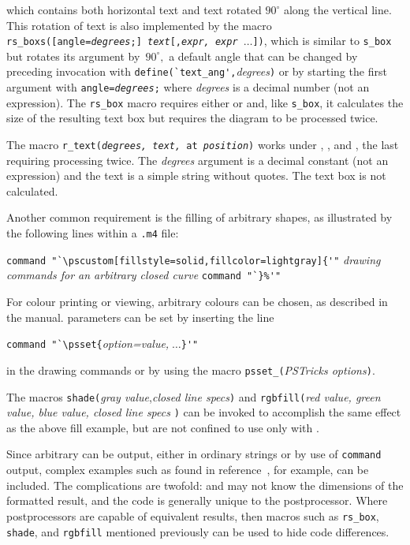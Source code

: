 {\small }

\noindent%
which contains both horizontal text and text rotated $90^\circ$ along the
vertical line.
This rotation of text is also implemented by the macro
{\tt rs\_boxs([angle={\sl degrees};] {\sl text}[,{\sl expr, expr $\ldots$}])},
which is similar
to {\tt s\_box} but rotates its argument by~$90^\circ,$ a default angle
that can be changed by preceding invocation with
\verb|define(`text_ang',|{\sl degrees}{\tt )}
or by starting the first argument with {\tt angle={\sl degrees};}
where {\sl degrees} is a decimal number (not an expression).
The {\tt rs\_box} macro
requires either \PSTricks or \TPGF and, like {\tt s\_box}, it calculates the
size of the resulting text box but requires the diagram to be
processed twice.

The macro {\tt r\_text({\sl degrees, text,} at {\sl position})}
works under \PSTricks, \TPGF, and \SVG, the last requiring
processing twice. The {\sl degrees} argument is a decimal constant
(not an expression) and the text is a simple string without quotes.
The text box is not calculated.

Another common requirement is the filling of arbitrary shapes, as
illustrated by the following lines within a {\tt .m4} file:

\vspace{\parsep}
\noindent%
\verb|command "`\pscustom[fillstyle=solid,fillcolor=lightgray]{'"|
\hfill\break
{\sl drawing commands for an arbitrary closed curve}
\hfill\break
\verb|command "`}%'"|
\vspace{\parsep}

For colour printing or viewing, arbitrary
colours can be chosen, as described in the \PSTricks manual.
\PSTricks parameters can be set by inserting the line

\vspace{\parsep}
\noindent\verb|command "`\psset{|{\sl option=value,}$\;\ldots$\verb|}'"|
\vspace{\parsep}

\noindent%
in the drawing commands or by using the macro
{\tt psset\_(}{\sl PSTricks options}{\tt )}.

The macros
 {\tt shade(}{\sl gray value},{\sl closed line specs}{\tt )}
and
 {\tt rgbfill(}{\sl red value, green value, blue value, closed line specs}%
 {\tt )}
can be invoked to accomplish the same effect as the above fill example, but
are not confined to use only with \PSTricks.

Since arbitrary \latex can be output, either in ordinary strings or by
use of {\tt command} output, complex examples such as found in
reference~\cite{Girou94},
for example, can be included.  The complications
are twofold: \latex and \dpic may not know the dimensions of the formatted
result, and the code is generally unique to the postprocessor.
Where postprocessors are capable of equivalent results, then
macros such as {\tt rs\_box}, {\tt shade}, and {\tt rgbfill} mentioned
previously can be used to hide code differences.

